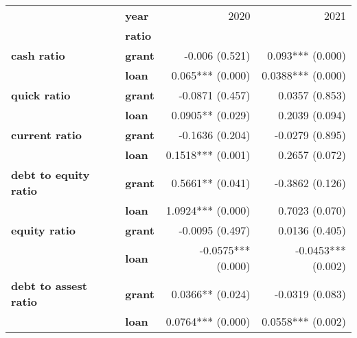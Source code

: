 \begin{tabular}{llrr}
\toprule
                     & \textbf{year} &                2020 &                2021 \\
{} & \textbf{ratio} &                     &                     \\
\midrule
\textbf{cash ratio} & \textbf{grant} &    -0.006   (0.521) &    0.093*** (0.000) \\
                     & \textbf{loan} &    0.065*** (0.000) &   0.0388*** (0.000) \\
\textbf{quick ratio} & \textbf{grant} &   -0.0871   (0.457) &    0.0357   (0.853) \\
                     & \textbf{loan} &   0.0905**  (0.029) &      0.2039 (0.094) \\
\textbf{current ratio} & \textbf{grant} &   -0.1636   (0.204) &   -0.0279   (0.895) \\
                     & \textbf{loan} &   0.1518*** (0.001) &      0.2657 (0.072) \\
\textbf{debt to equity ratio} & \textbf{grant} &   0.5661**  (0.041) &   -0.3862   (0.126) \\
                     & \textbf{loan} &   1.0924*** (0.000) &      0.7023 (0.070) \\
\textbf{equity ratio} & \textbf{grant} &   -0.0095   (0.497) &    0.0136   (0.405) \\
                     & \textbf{loan} &  -0.0575*** (0.000) &  -0.0453*** (0.002) \\
\textbf{debt to assest ratio} & \textbf{grant} &   0.0366**  (0.024) &     -0.0319 (0.083) \\
                     & \textbf{loan} &   0.0764*** (0.000) &   0.0558*** (0.002) \\
\bottomrule
\end{tabular}
